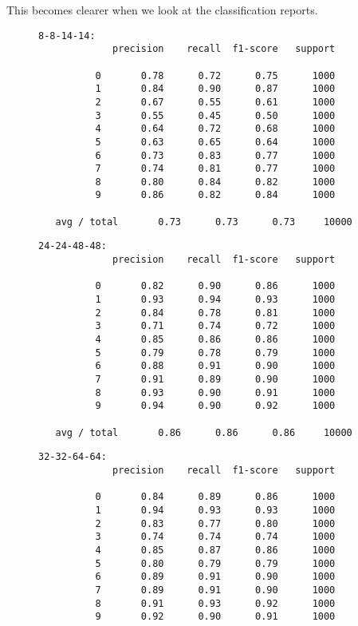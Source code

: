 This becomes clearer when we look at the classification reports.
\begin{figure}
\begin{verbatim}
8-8-14-14:
             precision    recall  f1-score   support
             
          0       0.78      0.72      0.75      1000
          1       0.84      0.90      0.87      1000
          2       0.67      0.55      0.61      1000
          3       0.55      0.45      0.50      1000
          4       0.64      0.72      0.68      1000
          5       0.63      0.65      0.64      1000
          6       0.73      0.83      0.77      1000
          7       0.74      0.81      0.77      1000
          8       0.80      0.84      0.82      1000
          9       0.86      0.82      0.84      1000
             
   avg / total       0.73      0.73      0.73     10000
\end{verbatim}
\begin{verbatim}  
24-24-48-48:
             precision    recall  f1-score   support
             
          0       0.82      0.90      0.86      1000
          1       0.93      0.94      0.93      1000
          2       0.84      0.78      0.81      1000
          3       0.71      0.74      0.72      1000
          4       0.85      0.86      0.86      1000
          5       0.79      0.78      0.79      1000
          6       0.88      0.91      0.90      1000
          7       0.91      0.89      0.90      1000
          8       0.93      0.90      0.91      1000
          9       0.94      0.90      0.92      1000
             
   avg / total       0.86      0.86      0.86     10000
\end{verbatim}
\begin{verbatim}    
32-32-64-64:
             precision    recall  f1-score   support
             
          0       0.84      0.89      0.86      1000
          1       0.94      0.93      0.93      1000
          2       0.83      0.77      0.80      1000
          3       0.74      0.74      0.74      1000
          4       0.85      0.87      0.86      1000
          5       0.80      0.79      0.79      1000
          6       0.89      0.91      0.90      1000
          7       0.89      0.91      0.90      1000
          8       0.91      0.93      0.92      1000
          9       0.92      0.90      0.91      1000
             

\end{verbatim}
\end{figure}
